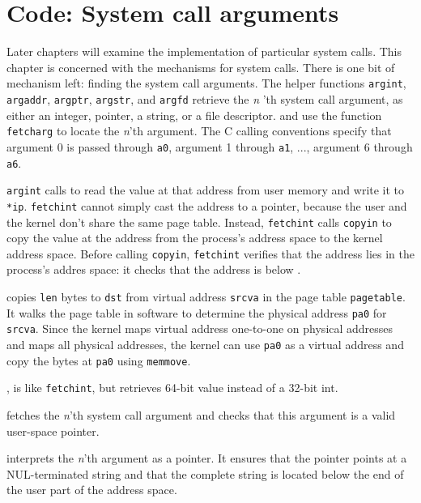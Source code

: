 \section{Code: System call arguments}

Later chapters will examine the implementation of
particular system calls.
This chapter is concerned with the mechanisms for system calls.
There is one bit of mechanism left: finding the system call arguments.
The helper functions
\lstinline{argint},
\lstinline{argaddr},
\lstinline{argptr},
\lstinline{argstr},
and
\lstinline{argfd}
retrieve the 
\textit{n} 'th 
system call
argument, as either an integer, pointer, a string, or a file descriptor.
and
use the function
\lstinline{fetcharg}
to locate the
\textit{n}'th 
argument. The C calling conventions specify that argument 0 is passed
through
\texttt{a0},
argument 1 through
\texttt{a1}, ...,
argument 6 through
\texttt{a6}.

\lstinline{argint} calls  to read the value at
that address from user memory and write it to \lstinline{*ip}.
\lstinline{fetchint} cannot simply cast the address to a pointer,
because the user and the kernel don't share the same page
table. Instead, \lstinline{fetchint} calls \lstinline{copyin} to copy
the value at the address from the process's address space to the
kernel address space.  Before calling \lstinline{copyin},
\lstinline{fetchint} verifies that the address lies in the process's
addres space: it checks that the address is below .

 copies \lstinline{len} bytes to
\lstinline{dst} from virtual address \lstinline{srcva} in the page
table \lstinline{pagetable}.  It walks the page table in software to
determine the physical address \lstinline{pa0} for \lstinline{srcva}.
Since the kernel maps virtual address one-to-one on physical
addresses and maps all physical addresses, the kernel can use
\lstinline{pa0} as a virtual address and copy the bytes at
\lstinline{pa0} using \lstinline{memmove}.

,
is like
\lstinline{fetchint},
but retrieves 64-bit value instead of a 32-bit int.

fetches the
\textit{n}'th 
system call argument and checks that this argument is a valid
user-space pointer.

interprets the
\textit{n}'th 
argument as a pointer.  It ensures that the pointer points at a
NUL-terminated string and that the complete string is located below
the end of the user part of the address space.

